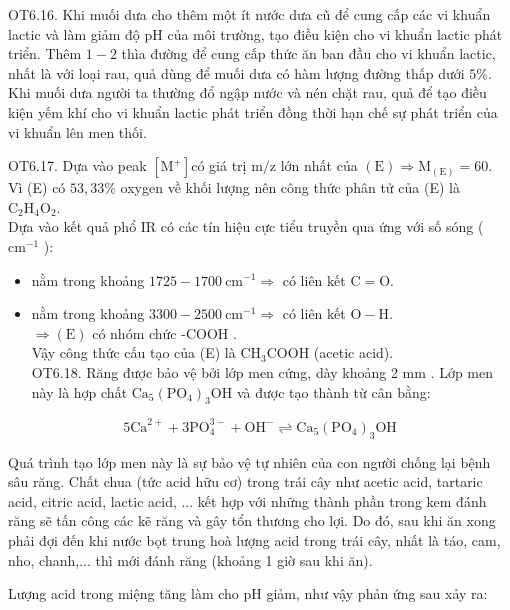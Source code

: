 \documentclass[10pt]{article}
\begin{document}
OT6.16. Khi muối dưa cho thêm một ít nước dưa cũ để cung cấp các vi khuẩn lactic và làm giảm độ pH của môi trường, tạo điều kiện cho vi khuẩn lactic phát triển. Thêm $1-2$ thìa đường để cung cấp thức ăn ban đầu cho vi khuẩn lactic, nhất là với loại rau, quả dùng để muối dưa có hàm lượng đường thấp dưới $5 \%$. Khi muối dưa người ta thường đổ ngập nước và nén chặt rau, quả để tạo điều kiện yếm khí cho vi khuẩn lactic phát triển đồng thời hạn chế sự phát triển của vi khuẩn lên men thối.

OT6.17. Dựa vào peak $\left[\mathrm{M}^{+}\right]$có giá trị $\mathrm{m} / \mathrm{z}$ lớn nhất của $(\mathrm{E}) \Rightarrow \mathrm{M}_{(\mathrm{E})}=60$.\\
Vì (E) có $53,33 \%$ oxygen về khối lượng nên công thức phân tử của (E) là $\mathrm{C}_{2} \mathrm{H}_{4} \mathrm{O}_{2}$.\\
Dựa vào kết quả phổ IR có các tín hiệu cực tiểu truyền qua ứng với số sóng ( $\mathrm{cm}^{-1}$ ):

\begin{itemize}
  \item nằm trong khoảng $1725-1700 \mathrm{~cm}^{-1} \Rightarrow$ có liên kết $\mathrm{C}=\mathrm{O}$.
  \item nằm trong khoảng $3300-2500 \mathrm{~cm}^{-1} \Rightarrow$ có liên kết $\mathrm{O}-\mathrm{H}$.\\
$\Rightarrow(\mathrm{E})$ có nhóm chức -COOH .\\
Vậy công thức cấu tạo của (E) là $\mathrm{CH}_{3} \mathrm{COOH}$ (acetic acid).\\
OT6.18. Răng được bảo vệ bởi lớp men cứng, dày khoảng 2 mm . Lớp men này là hợp chất $\mathrm{Ca}_{5}\left(\mathrm{PO}_{4}\right)_{3} \mathrm{OH}$ và được tạo thành từ cân bằng:
\end{itemize}

$$
5 \mathrm{Ca}^{2+}+3 \mathrm{PO}_{4}^{3-}+\mathrm{OH}^{-} \rightleftharpoons \mathrm{Ca}_{5}\left(\mathrm{PO}_{4}\right)_{3} \mathrm{OH}
$$

Quá trình tạo lớp men này là sự bảo vệ tự nhiên của con người chống lại bệnh sâu răng. Chất chua (tức acid hữu cơ) trong trái cây như acetic acid, tartaric acid, citric acid, lactic acid, ... kết hợp với những thành phần trong kem đánh răng sẽ tấn công các kẽ răng và gây tổn thương cho lợi. Do đó, sau khi ăn xong phải đợi đến khi nước bọt trung hoà lượng acid trong trái cây, nhất là táo, cam, nho, chanh,... thì mới đánh răng (khoảng 1 giờ sau khi ăn).

Lượng acid trong miệng tăng làm cho pH giảm, như vậy phản ứng sau xảy ra:
\end{document}

